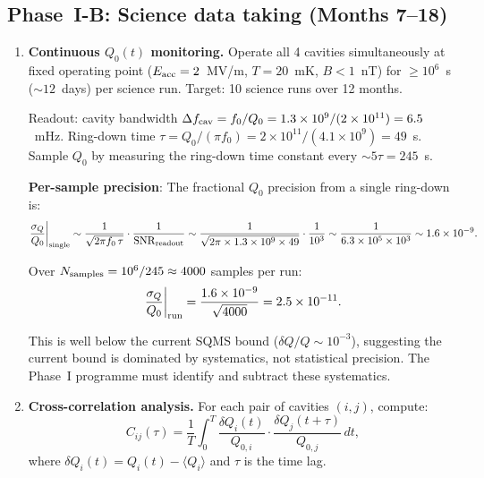 \documentclass[11pt]{article}
\newcommand{\ee}[1]{\times 10^{#1}}
\newcommand{\SNR}{\mathrm{SNR}}
\theoremstyle{definition}
\theoremstyle{remark}
\begin{document}
\subsection{Phase~I-B: Science data taking (Months 7--18)}

\begin{enumerate}[label=\textbf{Step \arabic*.}, resume, itemsep=6pt]

\item \textbf{Continuous $Q_0(t)$ monitoring.}
  Operate all 4 cavities simultaneously at fixed operating point
  ($E_{\rm acc} = 2$~MV/m, $T = 20$~mK, $B < 1$~nT) for
  $\geq 10^6$~s ($\sim 12$~days) per science run. Target: 10 science
  runs over 12 months.

  Readout: cavity bandwidth $\Delta f_{\rm cav} = f_0/Q_0
  = 1.3\ee{9}/(2\ee{11}) = 6.5$~mHz. Ring-down time
  $\tau = Q_0/(\pi f_0) = 2\ee{11}/(4.1\ee{9}) = 49$~s.
  Sample $Q_0$ by measuring the ring-down time constant every
  $\sim 5\tau = 245$~s.

  \textbf{Per-sample precision}: The fractional $Q_0$ precision from
  a single ring-down is:
  \begin{equation}
  \frac{\sigma_Q}{Q_0}\bigg|_{\rm single} \sim \frac{1}{\sqrt{2\pi f_0\,\tau}}
  \cdot\frac{1}{\SNR_{\rm readout}} \sim \frac{1}{\sqrt{2\pi\times 1.3\ee{9}
  \times 49}}\cdot\frac{1}{10^3} \sim \frac{1}{6.3\ee{5}\times 10^3}
  \sim 1.6\ee{-9}.
  \end{equation}

  Over $N_{\rm samples} = 10^6/245 \approx 4000$ samples per run:
  \begin{equation}
  \frac{\sigma_Q}{Q_0}\bigg|_{\rm run} = \frac{1.6\ee{-9}}{\sqrt{4000}}
  = 2.5\ee{-11}.
  \end{equation}

  This is well below the current SQMS bound ($\delta Q/Q \sim 10^{-3}$),
  suggesting the current bound is dominated by systematics, not
  statistical precision. The Phase~I programme must identify and
  subtract these systematics.

\item \textbf{Cross-correlation analysis.}
  For each pair of cavities $(i,j)$, compute:
  \begin{equation}
  C_{ij}(\tau) = \frac{1}{T}\int_0^T \frac{\delta Q_i(t)}{Q_{0,i}}
  \cdot\frac{\delta Q_j(t+\tau)}{Q_{0,j}}\,dt,
  \end{equation}
  where $\delta Q_i(t) = Q_i(t) - \langle Q_i\rangle$ and $\tau$ is
  the time lag.


\end{enumerate}
\end{document}
